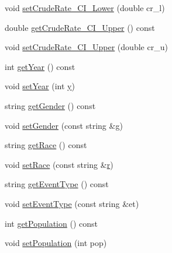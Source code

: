 \begin{DoxyCompactItemize}
\item 
void \mbox{\hyperlink{classbridges_1_1_cancer_incidence_a58cdb11fa6e8d2766d3ef98b1e8aea1f}{set\+Crude\+Rate\+\_\+\+C\+I\+\_\+\+Lower}} (double cr\+\_\+l)
\item 
double \mbox{\hyperlink{classbridges_1_1_cancer_incidence_abaa44824d7c7a88429c2ce429c4bdb4f}{get\+Crude\+Rate\+\_\+\+C\+I\+\_\+\+Upper}} () const
\item 
void \mbox{\hyperlink{classbridges_1_1_cancer_incidence_a40d654a767d9b20ffa6931591d96d42a}{set\+Crude\+Rate\+\_\+\+C\+I\+\_\+\+Upper}} (double cr\+\_\+u)
\item 
int \mbox{\hyperlink{classbridges_1_1_cancer_incidence_a61916d2b1e6fca8685f28fb62eccbc03}{get\+Year}} () const
\item 
void \mbox{\hyperlink{classbridges_1_1_cancer_incidence_ac4c0d949ebb21dd890afe2714962fa5a}{set\+Year}} (int \mbox{\hyperlink{namespacebridges_acfb0a4f7877d8f63de3e6862004c50eda415290769594460e2e485922904f345d}{y}})
\item 
string \mbox{\hyperlink{classbridges_1_1_cancer_incidence_aacca8d4a69cbe53943541fb4e0f5c773}{get\+Gender}} () const
\item 
void \mbox{\hyperlink{classbridges_1_1_cancer_incidence_ad4b8d6d3b226567f60af07fa8e5d21ae}{set\+Gender}} (const string \&\mbox{\hyperlink{namespacebridges_acfb0a4f7877d8f63de3e6862004c50edab2f5ff47436671b6e533d8dc3614845d}{g}})
\item 
string \mbox{\hyperlink{classbridges_1_1_cancer_incidence_ae6e0d4bc5aa55bc48891a43c433d59a7}{get\+Race}} () const
\item 
void \mbox{\hyperlink{classbridges_1_1_cancer_incidence_ae7cfd7532ab68ad521cc41d5172fd006}{set\+Race}} (const string \&\mbox{\hyperlink{namespacebridges_acfb0a4f7877d8f63de3e6862004c50eda4b43b0aee35624cd95b910189b3dc231}{r}})
\item 
string \mbox{\hyperlink{classbridges_1_1_cancer_incidence_a9bf24d732657528f06081f53aae6f3b8}{get\+Event\+Type}} () const
\item 
void \mbox{\hyperlink{classbridges_1_1_cancer_incidence_af17d0ebdf1a67834947e9cf5828c8fe3}{set\+Event\+Type}} (const string \&et)
\item 
int \mbox{\hyperlink{classbridges_1_1_cancer_incidence_aa0720b4ec24093bb1949c06be65e0445}{get\+Population}} () const
\item 
void \mbox{\hyperlink{classbridges_1_1_cancer_incidence_aaade0295abaeeabb23b9e03d5ffd364a}{set\+Population}} (int pop)
\item 

\end{DoxyCompactItemize}
